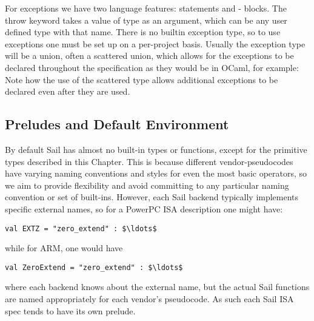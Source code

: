 For exceptions we have two language features:  statements
and - blocks. The throw keyword takes a value of
type  as an argument, which can be any user defined type
with that name. There is no builtin exception type, so to use
exceptions one must be set up on a per-project basis. Usually the
exception type will be a union, often a scattered union, which allows
for the exceptions to be declared throughout the specification as they
would be in OCaml, for example: 
Note how the use of the scattered type allows additional exceptions to
be declared even after they are used.

\subsection{Preludes and Default Environment}
\label{sec:prelude}

By default Sail has almost no built-in types or functions, except for
the primitive types described in this Chapter. This is because
different vendor-pseudocodes have varying naming conventions and
styles for even the most basic operators, so we aim to provide
flexibility and avoid committing to any particular naming convention or
set of built-ins. However, each Sail backend typically implements
specific external names, so for a PowerPC ISA description one might
have:
\begin{lstlisting}[mathescape]
val EXTZ = "zero_extend" : $\ldots$
\end{lstlisting}
while for ARM, one would have
\begin{lstlisting}[mathescape]
val ZeroExtend = "zero_extend" : $\ldots$
\end{lstlisting}
where each backend knows about the  external name,
but the actual Sail functions are named appropriately for each
vendor's pseudocode. As such each Sail ISA spec tends to have its own
prelude.

